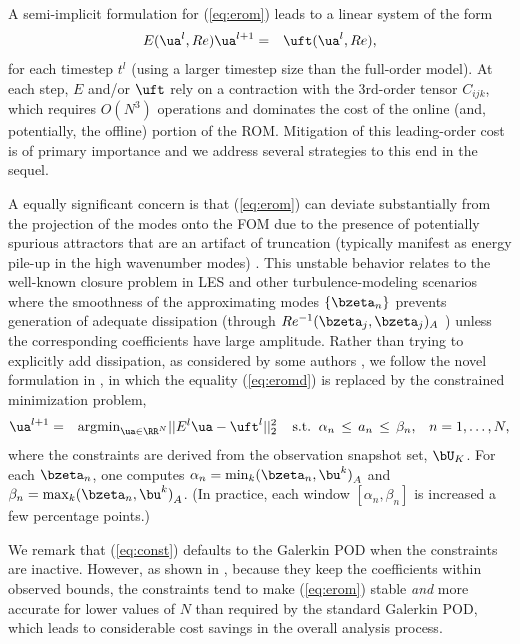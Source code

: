    A semi-implicit formulation
for (\ref{eq:erom}) leads to a linear system of the form
\begin{eqnarray} \label{eq:eromd}
E(\ua^l,Re) \ua^{l+1} &=& \uft (\ua^l,Re),
\end{eqnarray}
for each timestep $t^l$ (using a larger timestep size than the full-order model).
At each step, $E$ and/or $\uft$ rely on a contraction with the 3rd-order tensor 
$C_{ijk}$, which requires $O(N^3)$ operations and dominates the cost of the online (and,
potentially, the offline) portion of the ROM.  Mitigation of this leading-order
cost is of primary importance and we address several strategies to this end
in the sequel.

A equally significant concern is that (\ref{eq:erom}) can deviate substantially
from the projection of the modes onto the FOM due to the presence of potentially
spurious attractors that are an artifact of truncation (typically manifest as
energy pile-up in the high wavenumber modes)  \cite{fick18,rempfer00}.  This
unstable behavior relates to the well-known closure problem in LES and other
turbulence-modeling scenarios where the smoothness of the approximating modes
$\{\bzeta_n\}$ prevents generation of adequate dissipation (through $Re^{-1}
(\bzeta_j,\bzeta_j)_A$ ) unless the corresponding coefficients have large
amplitude.  Rather than trying to explicitly add dissipation, as considered by
some authors \cite{lumley88}, we follow the novel formulation in \cite{fick18},
in which the equality (\ref{eq:eromd}) is replaced by the constrained
minimization problem, \\[-3ex]
\begin{eqnarray} \label{eq:const}
\ua^{l+1} &=& \mbox{argmin}_{\ua \in \RR^N} || E^l \ua - \uft^l ||_2^2
\;\;\;\;\mbox{s.t.} \;\; \alpha_n \, \leq \, a_n \, \leq \, \beta_n,\;\;\; n=1,\dots,N,
\end{eqnarray}
where the constraints are derived from the observation snapshot set, $\bU_K$.
For each $\bzeta_n$, one computes $\alpha_n = \min_k (\bzeta_n,\bu^k)^{}_A$ and
$\beta_n = \max_k (\bzeta_n , \bu^k)^{}_A$.  (In practice, each window 
$[\alpha_n,\beta_n]$ is increased a few percentage points.)  

  We remark that (\ref{eq:const}) defaults to the Galerkin POD when the
constraints are inactive.  However, as shown in \cite{fick18}, because
they keep the coefficients within observed bounds, the constraints tend to
make (\ref{eq:erom}) stable {\em and} more accurate for lower values of $N$
than required by the standard Galerkin POD, which leads to considerable cost
savings in the overall analysis process.  

